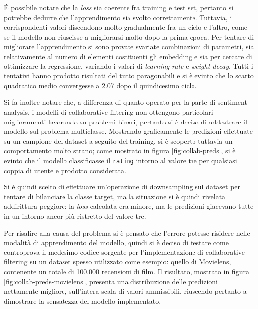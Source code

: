 \documentclass[hidelinks, 12pt]{article}
\begin{document}
É possibile notare che la \textit{loss} sia coerente fra training e test set, pertanto si potrebbe dedurre che l'apprendimento sia svolto correttamente. Tuttavia, i corrispondenti valori discendono molto gradualmente fra un ciclo e l'altro, come se il modello non riuscisse a migliorarsi molto dopo la prima epoca. Per tentare di migliorare l'apprendimento si sono provate svariate combinazioni di parametri, sia relativamente al numero di elementi costituenti gli embedding e sia per cercare di ottimizzare la regressione, variando i valori di \textit{learning rate} e \textit{weight decay}. Tutti i tentativi hanno prodotto risultati del tutto paragonabili e si è evinto che lo scarto quadratico medio convergesse a 2.07 dopo il quindicesimo ciclo.

Si fa inoltre notare che, a differenza di quanto operato per la parte di sentiment analysis, i modelli di collaborative filtering non ottengono particolari miglioramenti lavorando su problemi binari, pertanto si è deciso di addestrare il modello sul problema multiclasse. Mostrando graficamente le predizioni effettuate su un campione del dataset a seguito del training, si è scoperto tuttavia un comportamento molto strano; come mostrato in figura \ref{fig:collab-preds}, si è evinto che il modello classificasse il \texttt{rating} intorno al valore tre per qualsiasi coppia di utente e prodotto considerata.

Si è quindi scelto di effettuare un'operazione di downsampling sul dataset per tentare di bilanciare la classe target, ma la situazione si è quindi rivelata addirittura peggiore: la \textit{loss} calcolata era minore, ma le predizioni giacevano tutte in un intorno ancor più ristretto del valore tre.

Per risalire alla causa del problema si è pensato che l'errore potesse risidere nelle modalità di apprendimento del modello, quindi si è deciso di testare come controprova il medesimo codice sorgente per l'implementazione di collaborative filtering su un dataset spesso utilizzato come esempio: quello di Movielens, contenente un totale di 100.000 recensioni di film. Il risultato, mostrato in figura \ref{fig:collab-preds-movielens}, presenta una distribuzione delle predizioni nettamente migliore, sull'intera scala di valori ammissibili, riuscendo pertanto a dimostrare la sensatezza del modello implementato.
\end{document}
